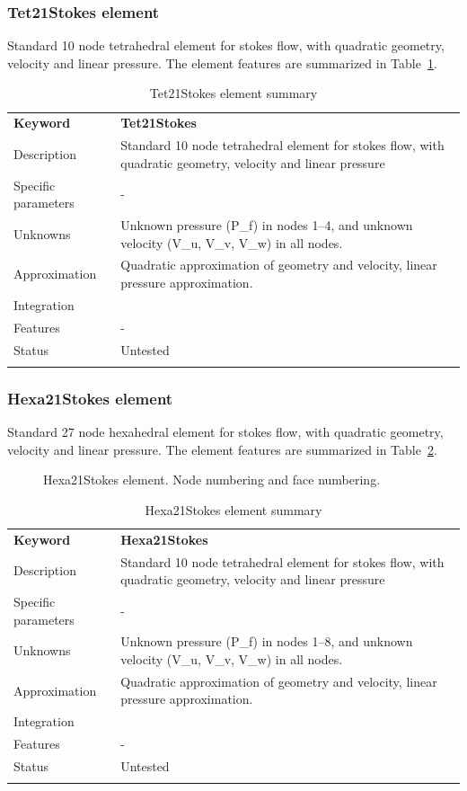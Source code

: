 \documentclass[a4paper]{article}
\newcommand{\param}[1]{\texttt{#1}} %
\newcommand{\templabel}{}%
\newcommand{\tempcaption}{}%
\newcounter{nelpar}
\newenvironment{elementsummary}[5]{%
  \gdef\tempcaption{#4}%
  \gdef\templabel{#5}%
  \setcounter{nelpar}{0}%
  \begin{center} %
    \begin{table}[!htb] %
      \begin{tabular}{|l|p{9cm}|}\hline %
        {\bf Keyword} & \bf{#1}\\ %
        {Description} & {#2}\\ %
        {Specific parameters} & {#3}\\ \hline %
}{
  \\ \hline %
      \end{tabular}%
      \caption{\tempcaption}%
      \label{\templabel}%
    \end{table}%
  \end{center}%
}
\newcommand{\elementParam}[1]{%
  \ifthenelse{\value{nelpar}>0} %
             {&{#1}}%
             {\setcounter{nelpar}{1}Parameters&{#1}}%
             \\%
}
\newcommand{\elementDescription}[2]{{#1} & {#2}\\}
\begin{document}
\subsubsection{Tet21Stokes element}
Standard 10 node tetrahedral element for stokes flow, with quadratic geometry, velocity and linear pressure. The element features are summarized in Table~\ref{Tet21Stokessummary}.

\begin{elementsummary}{Tet21Stokes}{Standard 10 node tetrahedral element for stokes flow, with quadratic geometry, velocity and linear pressure}{-}{Tet21Stokes element summary}{Tet21Stokessummary}
\elementDescription{Unknowns}{Unknown pressure (P\_f) in nodes 1--4, and unknown velocity (V\_u, V\_v, V\_w) in all nodes.}
\elementDescription{Approximation}{Quadratic approximation of geometry and velocity, linear pressure approximation.}
\elementDescription{Integration}{}
\elementDescription{Features}{-}
\elementDescription{Status}{Untested}
\end{elementsummary}

\subsubsection{Hexa21Stokes element}
Standard 27 node hexahedral element for stokes flow, with quadratic geometry, velocity and linear pressure. The element features are summarized in Table~\ref{Hexa21Stokessummary}.

\begin{figure}[htb]
 \centering
 \begin{makeimage}
  \raisebox{-0.5\height}{}
  \raisebox{-0.5\height}{}
 \end{makeimage}
 \caption{Hexa21Stokes element. Node numbering and face numbering.}
 \label{Hexa21Stokes}
\end{figure}

\begin{elementsummary}{Hexa21Stokes}{Standard 10 node tetrahedral element for stokes flow, with quadratic geometry, velocity and linear pressure}{-}{Hexa21Stokes element summary}{Hexa21Stokessummary}
\elementDescription{Unknowns}{Unknown pressure (P\_f) in nodes 1--8, and unknown velocity (V\_u, V\_v, V\_w) in all nodes.}
\elementDescription{Approximation}{Quadratic approximation of geometry and velocity, linear pressure approximation.}
\elementDescription{Integration}{}
\elementDescription{Features}{-}
\elementDescription{Status}{Untested}
\end{elementsummary}
\end{document}
